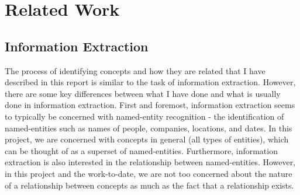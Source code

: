 \documentclass[12pt]{article}
\theoremstyle{grammarstyle}
\begin{document}

\section{Related Work} \label{sec:related_work}
\subsection{Information Extraction}
The process of identifying concepts and how they are related that I have described in this report is similar to the task of information extraction. However, there are some key differences between what I have done and what is usually done in information extraction. First and foremost, information extraction seems to typically be concerned with named-entity recognition - the identification of named-entities such as names of people, companies, locations, and dates. In this project, we are concerned with concepts in general (all types of entities), which can be thought of as a superset of named-entities. Furthermore, information extraction is also interested in the relationship between named-entities. However, in this project and the work-to-date, we are not too concerned about the nature of a relationship between concepts as much as the fact that a relationship exists.
\end{document}
